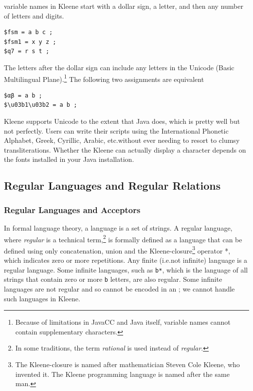 \fsm{} variable names in Kleene start with a dollar sign, a letter, and then any number of
letters and digits.


\begin{Verbatim}
$fsm = a b c ;
$fsm1 = x y z ;
$q7 = r s t ;
\end{Verbatim}

\noindent
The letters after the dollar sign can include any letters in the Unicode  (Basic
Multilingual Plane).\footnote{Because of limitations in JavaCC and Java itself, variable
names cannot contain supplementary characters.}  The following two assignments are equivalent 


\begin{Verbatim}
$αβ = a b ;
$\u03b1\u03b2 = a b ;
\end{Verbatim}

Kleene supports Unicode to the extent that Java does, which is pretty well but not
perfectly.  Users can write their scripts using the International Phonetic Alphabet, Greek,
Cyrillic, Arabic, etc.\@ without ever needing to resort to clumsy transliterations.
Whether the Kleene \gui{} can actually display a character depends on the fonts installed in
your Java installation.

\subsection{Regular Languages and Regular Relations}

\subsubsection{Regular Languages and Acceptors}

In formal language theory, a language is a set of strings.  A regular language, where
\emph{regular} is a technical term,\footnote{In some traditions, the term
\emph{rational} is used instead of \emph{regular}.} is formally defined as a language that can be defined
using only concatenation, union and the Kleene-closure\footnote{The Kleene-closure is named
after mathematician Steven Cole Kleene, who invented it.  The Kleene programming language
is named after the same man.} operator *, which indicates zero or
more repetitions.  Any finite (i.e.\@ not infinite) language is a regular language.  Some infinite languages,
such as \verb!b*!, which is the language of all strings that contain zero or more
\texttt{b} letters, are also regular.  Some infinite languages are not regular
and so cannot be encoded in an \fsm{}; we cannot handle such languages in Kleene.

